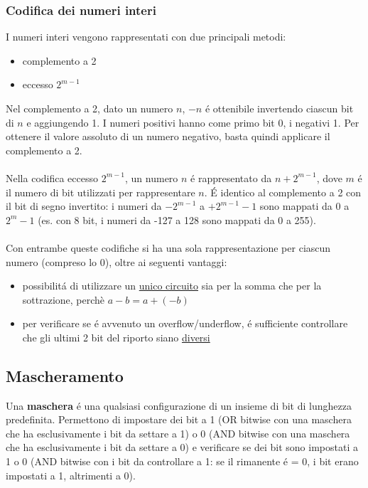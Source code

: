 \documentclass{article}
\begin{document}
\subsubsection{Codifica dei numeri interi}
I numeri interi vengono rappresentati con due principali metodi:
\begin{itemize}
	\item complemento a 2
	\item eccesso $2^{m-1}$
\end{itemize}
Nel complemento a 2, dato un numero $n$, $-n$ é ottenibile invertendo ciascun bit di $n$ e aggiungendo 1. I numeri positivi hanno come primo bit 0, i negativi 1. Per ottenere il valore assoluto di un numero negativo, basta quindi applicare il complemento a 2.\\\\
Nella codifica eccesso $2^{m-1}$, un numero $n$ é rappresentato da $n + 2^{m-1}$, dove $m$ é il numero di bit utilizzati per rappresentare $n$. É identico al complemento a 2 con il bit di segno invertito: i numeri da $-2^{m-1}$ a $+2^{m-1}-1$ sono mappati da $0$ a $2^{m}-1$ (es. con 8 bit, i numeri da -127 a 128 sono mappati da 0 a 255).\\\\
Con entrambe queste codifiche si ha una sola rappresentazione per ciascun numero (compreso lo 0), oltre ai seguenti vantaggi:
\begin{itemize}
	\item possibilitá di utilizzare un \underline{unico circuito} sia per la somma che per la sottrazione, perchè $a-b=a+(-b)$
	\item per verificare se é avvenuto un overflow/underflow, é sufficiente controllare che gli ultimi 2 bit del riporto siano \underline{diversi}
\end{itemize}

\subsection{Mascheramento}
Una \textbf{maschera} é una qualsiasi configurazione di un insieme di bit di lunghezza predefinita. Permettono di impostare dei bit a 1 (OR bitwise con una maschera che ha esclusivamente i bit da settare a 1) o 0 (AND bitwise con una maschera che ha esclusivamente i bit da settare a 0) e verificare se dei bit sono impostati a 1 o 0 (AND bitwise con i bit da controllare a 1: se il rimanente é = 0, i bit erano impostati a 1, altrimenti a 0).
\end{document}
